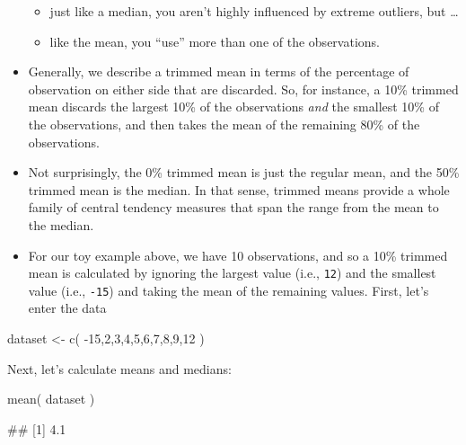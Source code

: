 \documentclass[
]{book}
\newenvironment{Shaded}{\begin{snugshade}}{\end{snugshade}}
\newcommand{\DecValTok}[1]{\textcolor[rgb]{0.00,0.00,0.81}{#1}}
\newcommand{\FunctionTok}[1]{\textcolor[rgb]{0.00,0.00,0.00}{#1}}
\newcommand{\NormalTok}[1]{#1}
\newcommand{\OtherTok}[1]{\textcolor[rgb]{0.56,0.35,0.01}{#1}}
\newcommand{\SpecialCharTok}[1]{\textcolor[rgb]{0.00,0.00,0.00}{#1}}
\providecommand{\tightlist}{%
  \setlength{\itemsep}{0pt}\setlength{\parskip}{0pt}}
\begin{document}
\begin{itemize}
  \begin{itemize}
  \tightlist
  \item
    just like a median, you aren't highly influenced by extreme outliers, but \ldots{}
  \item
    like the mean, you ``use'' more than one of the observations.
  \end{itemize}
\item
  Generally, we describe a trimmed mean in terms of the percentage of observation on either side that are discarded. So, for instance, a 10\% trimmed mean discards the largest 10\% of the observations \emph{and} the smallest 10\% of the observations, and then takes the mean of the remaining 80\% of the observations.
\item
  Not surprisingly, the 0\% trimmed mean is just the regular mean, and the 50\% trimmed mean is the median. In that sense, trimmed means provide a whole family of central tendency measures that span the range from the mean to the median.
\item
  For our toy example above, we have 10 observations, and so a 10\% trimmed mean is calculated by ignoring the largest value (i.e., \texttt{12}) and the smallest value (i.e., \texttt{-15}) and taking the mean of the remaining values. First, let's enter the data
\end{itemize}

\begin{Shaded}
\begin{Highlighting}[]
\NormalTok{dataset }\OtherTok{\textless{}{-}} \FunctionTok{c}\NormalTok{( }\SpecialCharTok{{-}}\DecValTok{15}\NormalTok{,}\DecValTok{2}\NormalTok{,}\DecValTok{3}\NormalTok{,}\DecValTok{4}\NormalTok{,}\DecValTok{5}\NormalTok{,}\DecValTok{6}\NormalTok{,}\DecValTok{7}\NormalTok{,}\DecValTok{8}\NormalTok{,}\DecValTok{9}\NormalTok{,}\DecValTok{12}\NormalTok{ )}
\end{Highlighting}
\end{Shaded}

Next, let's calculate means and medians:

\begin{Shaded}
\begin{Highlighting}[]
\FunctionTok{mean}\NormalTok{( dataset )}
\end{Highlighting}
\end{Shaded}

\begin{Shaded}
\begin{Highlighting}[]
\NormalTok{\#\# [1] 4.1}
\end{Highlighting}
\end{Shaded}
\end{document}
